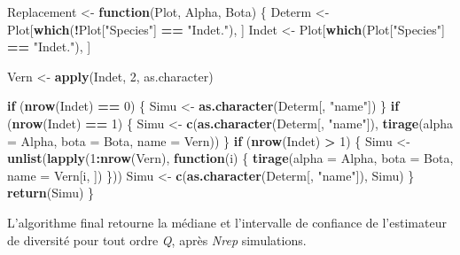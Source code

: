 \documentclass[
  11pt,
  french,
  A4paper,
  extrafontsizes,onecolumn,openright
  ]{memoir}
\newenvironment{Shaded}{\begin{snugshade}}{\end{snugshade}}
\newcommand{\KeywordTok}[1]{\textcolor[rgb]{0.13,0.29,0.53}{\textbf{#1}}}
\newcommand{\DataTypeTok}[1]{\textcolor[rgb]{0.13,0.29,0.53}{#1}}
\newcommand{\DecValTok}[1]{\textcolor[rgb]{0.00,0.00,0.81}{#1}}
\newcommand{\StringTok}[1]{\textcolor[rgb]{0.31,0.60,0.02}{#1}}
\newcommand{\ControlFlowTok}[1]{\textcolor[rgb]{0.13,0.29,0.53}{\textbf{#1}}}
\newcommand{\OperatorTok}[1]{\textcolor[rgb]{0.81,0.36,0.00}{\textbf{#1}}}
\newcommand{\NormalTok}[1]{#1}
\begin{document}
\begin{Shaded}
\begin{Highlighting}[]
\NormalTok{Replacement <-}\StringTok{ }\ControlFlowTok{function}\NormalTok{(Plot, Alpha, Bota) \{}
\NormalTok{    Determ <-}\StringTok{ }\NormalTok{Plot[}\KeywordTok{which}\NormalTok{(}\OperatorTok{!}\NormalTok{Plot[}\StringTok{"Species"}\NormalTok{] }\OperatorTok{==}\StringTok{ "Indet."}\NormalTok{), ]}
\NormalTok{    Indet <-}\StringTok{ }\NormalTok{Plot[}\KeywordTok{which}\NormalTok{(Plot[}\StringTok{"Species"}\NormalTok{] }\OperatorTok{==}\StringTok{ "Indet."}\NormalTok{), ]}
    
\NormalTok{    Vern <-}\StringTok{ }\KeywordTok{apply}\NormalTok{(Indet, }\DecValTok{2}\NormalTok{, as.character)}
    
    \ControlFlowTok{if}\NormalTok{ (}\KeywordTok{nrow}\NormalTok{(Indet) }\OperatorTok{==}\StringTok{ }\DecValTok{0}\NormalTok{) \{}
\NormalTok{        Simu <-}\StringTok{ }\KeywordTok{as.character}\NormalTok{(Determ[, }\StringTok{"name"}\NormalTok{])}
\NormalTok{    \}}
    \ControlFlowTok{if}\NormalTok{ (}\KeywordTok{nrow}\NormalTok{(Indet) }\OperatorTok{==}\StringTok{ }\DecValTok{1}\NormalTok{) \{}
\NormalTok{        Simu <-}\StringTok{ }\KeywordTok{c}\NormalTok{(}\KeywordTok{as.character}\NormalTok{(Determ[, }\StringTok{"name"}\NormalTok{]), }\KeywordTok{tirage}\NormalTok{(}\DataTypeTok{alpha =}\NormalTok{ Alpha, }\DataTypeTok{bota =}\NormalTok{ Bota, }
            \DataTypeTok{name =}\NormalTok{ Vern))}
\NormalTok{    \}}
    \ControlFlowTok{if}\NormalTok{ (}\KeywordTok{nrow}\NormalTok{(Indet) }\OperatorTok{>}\StringTok{ }\DecValTok{1}\NormalTok{) \{}
\NormalTok{        Simu <-}\StringTok{ }\KeywordTok{unlist}\NormalTok{(}\KeywordTok{lapply}\NormalTok{(}\DecValTok{1}\OperatorTok{:}\KeywordTok{nrow}\NormalTok{(Vern), }\ControlFlowTok{function}\NormalTok{(i) \{}
            \KeywordTok{tirage}\NormalTok{(}\DataTypeTok{alpha =}\NormalTok{ Alpha, }\DataTypeTok{bota =}\NormalTok{ Bota, }\DataTypeTok{name =}\NormalTok{ Vern[i, ])}
\NormalTok{        \}))}
\NormalTok{        Simu <-}\StringTok{ }\KeywordTok{c}\NormalTok{(}\KeywordTok{as.character}\NormalTok{(Determ[, }\StringTok{"name"}\NormalTok{]), Simu)}
\NormalTok{    \}}
    \KeywordTok{return}\NormalTok{(Simu)}
\NormalTok{\}}
\end{Highlighting}
\end{Shaded}

L'algorithme final retourne la médiane et l'intervalle de confiance de
l'estimateur de diversité pour tout ordre \emph{Q}, après \emph{Nrep}
simulations.
\end{document}
